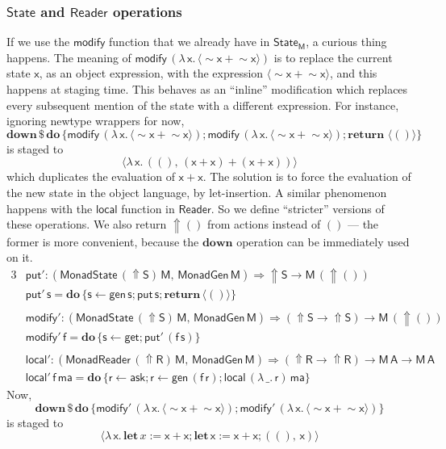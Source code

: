 \documentclass[acmsmall,screen,review,anonymous]{acmart}
\newcommand{\mit}[1]{{\mathsf{#1}}}
\newcommand{\msf}[1]{{\mathsf{#1}}}
\newcommand{\mbf}[1]{{\mathbf{#1}}}
\newcommand{\bs}[1]{\boldsymbol{#1}}
\newcommand{\mdo}{\mbf{do}\,}
\newcommand{\return}{\mbf{return}\,}
\newcommand{\lam}{\lambda\,}
\newcommand{\M}{\msf{M}}
\newcommand{\letdef}{\mbf{let\,}}
\newcommand{\vma}{\mathsf{ma}}
\newcommand{\vA}{\mathsf{A}}
\newcommand{\vS}{\mathsf{S}}
\newcommand{\vR}{\mathsf{R}}
\newcommand{\vM}{\mathsf{M}}
\newcommand{\vx}{\mathsf{x}}
\newcommand{\vf}{\mathsf{f}}
\newcommand{\vs}{\mathsf{s}}
\newcommand{\vr}{\mathsf{r}}
\newcommand{\Reader}{\msf{Reader}}
\newcommand{\fro}{\leftarrow}
\newcommand{\Up}{{\Uparrow}}
\newcommand{\spl}{{\bs{\sim}}}
\newcommand{\ql}{{\bs{\langle}}}
\newcommand{\qr}{{\bs{\rangle}}}
\theoremstyle{remark}
\newcommand{\mdown}{\mbf{down}}
\newcommand{\gen}{\mit{gen}}
\newcommand{\qt}[1]{\ql#1\qr}
\newcommand{\MonadGen}{\msf{MonadGen}}
\newcommand{\MonadState}{\msf{MonadState}}
\newcommand{\MonadReader}{\msf{MonadReader}}
\newcommand{\RA}{\Rightarrow}
\newcommand{\dlr}{\,\$\,}
\newcommand{\State}{\msf{State}}
\newcommand{\modify}{\mit{modify}}
\newcommand{\get}{\mit{get}}
\newcommand{\mput}{\mit{put}}
\begin{document}
\subsubsection{$\State$ and $\Reader$ operations} If we use
the $\modify$ function that we already have in $\State_\M$, a curious thing
happens. The meaning of $\modify\,(\lam \vx.\,\qt{\spl \vx + \spl \vx})$ is to
replace the current state $\vx$, as an object expression, with the expression
$\qt{\spl \vx + \spl \vx}$, and this happens at staging time. This behaves as an
``inline'' modification which replaces every subsequent mention of the state
with a different expression. For instance, ignoring newtype wrappers for now,
\[ \mdown \dlr \mdo \{\modify\,(\lam \vx.\,\qt{\spl \vx + \spl \vx}); \modify\,(\lam \vx.\,\qt{\spl \vx + \spl \vx});\return\,\qt{()}\} \]
is staged to
\[ \qt{\lam \vx.\,((),\,(\vx + \vx) + (\vx + \vx))} \]
which duplicates the evaluation of $\vx + \vx$. The solution is to force the
evaluation of the new state in the object language, by let-insertion. A similar
phenomenon happens with the $\mit{local}$ function in $\Reader$. So we define
``stricter'' versions of these operations. We also return $\Up ()$ from
actions instead of $()$ --- the former is more convenient, because the $\mdown$
operation can be immediately used on it.
\begingroup
\allowdisplaybreaks
\begin{alignat*}{3}
  & \mput' : (\MonadState\,(\Up \vS)\,\vM,\,\MonadGen\,\vM) \RA \Up \vS \to \vM\,(\Up ()) \\
  & \mput'\,\vs = \mdo \{\vs \fro \gen\,\vs; \mput\,\vs; \return \qt{()}\}\\
  &\\
  & \modify' : (\MonadState\,(\Up \vS)\,\vM,\,\MonadGen\,\vM) \RA (\Up \vS \to \Up \vS) \to \vM\,(\Up ()) \\
  & \modify'\,\vf = \mdo \{\vs \fro \get; \mput'\,(\vf\,\vs)\}\\
  &\\
  & \mit{local'} : (\MonadReader\,(\Up \vR)\,\vM,\,\MonadGen\,\vM) \RA (\Up \vR \to \Up \vR) \to \vM\,\vA \to \vM\,\vA\\
  & \mit{local'}\,\vf\,\vma = \mdo \{\vr \fro \mit{ask}; \vr \fro \gen\,(\vf\,\vr);\mit{local}\,(\lam \_.\,\vr)\,\vma\}
\end{alignat*}
\endgroup
Now,
\[ \mdown \dlr \mdo \{\modify'\,(\lam \vx.\,\qt{\spl \vx + \spl \vx}); \modify'\,(\lam \vx.\,\qt{\spl \vx + \spl \vx})\} \]
is staged to
\[ \qt{\lam \vx.\,\letdef x := \vx + \vx; \letdef \vx := \vx + \vx; ((),\,\vx)} \]
\end{document}
